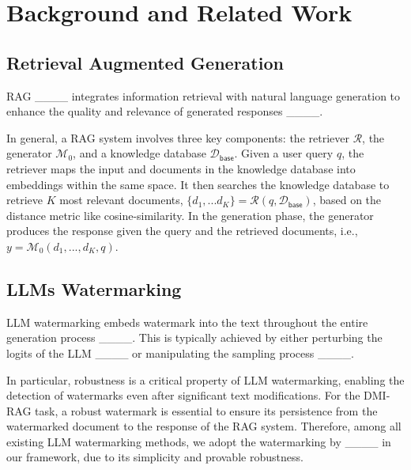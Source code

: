 \section{Background and Related Work}
\vspace{-0.2em}
\subsection{Retrieval Augmented Generation}
\vspace{-0.3em}
RAG ____ integrates information retrieval with natural language generation to enhance the quality and relevance of generated responses ____. 


In general, a RAG system involves three key components: the retriever $\mathcal{R}$, the generator $\mathcal{M}_0$, and a knowledge database $\mathcal{D}_{\mathsf{base}}$. Given a user query $q$, the retriever maps the input and documents in the knowledge database into embeddings within the same space. It then searches the knowledge database to retrieve $K$ most relevant documents, $\{d_1,...d_K\}=\mathcal{R}(q, \mathcal{D}_{\mathsf{base}})$, based on the distance metric like cosine-similarity. In the generation phase, the generator produces the response given the query and the retrieved documents, i.e., $y=\mathcal{M}_0(d_1,...,d_K,q)$.

\vspace{-0.5em}

\subsection{LLMs Watermarking} 
\vspace{-0.5em}
LLM watermarking embeds watermark into the text throughout the entire generation process ____. This is typically achieved by either perturbing the logits of the LLM ____ or manipulating the sampling process ____. 

In particular, robustness is a critical property of LLM watermarking, enabling the detection of watermarks even after significant text modifications. For the DMI-RAG task, a robust watermark is essential to ensure its persistence from the watermarked document to the response of the RAG system. Therefore, among all existing LLM watermarking methods, we adopt the watermarking by ____ in our framework, due to its simplicity and provable robustness. 


\vspace{-0.5em}

